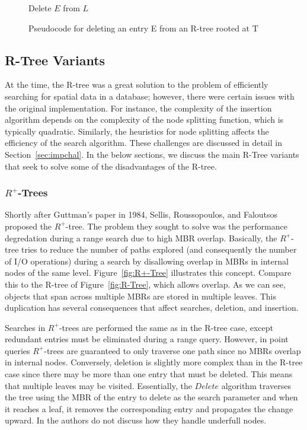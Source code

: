 \begin{figure}[t]
\begin{algorithmic}
	\State {}
	\State Delete $E$ from $L$
	\State {}
\EndFunction
\end{algorithmic}
\caption{Pseudocode for deleting an entry E from an R-tree rooted at T}
\label{fig:R_Tree_Delete}
\end{figure}

\subsection{R-Tree Variants}
\label{sec:variants}
At the time, the R-tree  was a great solution to the problem of efficiently searching
for spatial data in a database; however, there were certain issues with the original
implementation. For instance, the complexity of the insertion algorithm
depends on the complexity of the node splitting function, which is typically
quadratic. Similarly, the heuristics for node splitting affects the efficiency of 
the search algorithm. These challenges are discussed in detail in 
Section~\ref{sec:impchal}. In the below sections, we discuss the main R-Tree
variants that seek to solve some of the disadvantages of the R-tree.

\subsubsection{$R^{+}$-Trees}
Shortly after Guttman's paper in 1984, Sellis, Roussopoulos, and Faloutsos proposed 
the $R^{+}$-tree. The problem they sought to solve was the performance degredation 
during a range search due to high MBR overlap. Basically, the $R^{+}$-tree tries to 
reduce the number of paths explored (and consequently the number of I/O operations) 
during a search by disallowing overlap in MBRs in internal nodes of the same level. 
Figure~\ref{fig:R+-Tree} illustrates this concept. Compare this to the R-tree of 
Figure~\ref{fig:R-Tree}, which allows overlap. As we can see, objects that span 
across multiple MBRs are stored in multiple leaves. This duplication has several 
consequences that affect searches, deletion, and insertion.

Searches in $R^{+}$-trees are performed the same as in the R-tree case, except
redundant entries must be eliminated during a range query. However, in point queries
$R^{+}$-trees are guaranteed to only traverse one path since no MBRs overlap in 
internal nodes. Conversely, deletion is slightly more complex than in the R-tree case
since there may be more than one entry that must be deleted. This means that multiple 
leaves may be visited. Essentially, the $Delete$ algorithm traverses the tree using
the MBR of the entry to delete as the search parameter and when it reaches a leaf, it 
removes the corresponding entry and propagates the change upward. In \cite{sellisroussopoulosfaloutsos87} the authors do not discuss how they handle underfull nodes.


